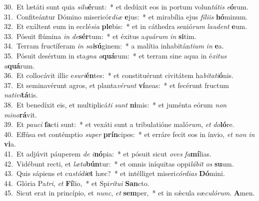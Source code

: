 {30.~}Et lætáti sunt quia \textit{si}\textit{lu}\textbf{é}runt:~* et dedúxit eos in portum volun\textit{tá}\textit{tis} \textit{e}\textbf{ó}rum.\\
{31.~}Confiteántur Dómino misericór\textit{di}\textit{æ} \textbf{e}jus:~* et mirabília ejus \textit{fí}\textit{li}\textit{is} \textbf{hó}minum.\\
{32.~}Et exáltent eum in ecclé\textit{si}\textit{a} \textbf{ple}bis:~* et in cáthedra senió\textit{rum} \textit{lau}\textit{dent} \textbf{e}um.\\
{33.~}Pósuit flúmina \textit{in} \textit{de}\textbf{sér}tum:~* et éxitus a\textit{quá}\textit{rum} \textit{in} \textbf{si}tim.\\
{34.~}Terram fructíferam \textit{in} \textit{sal}\textbf{sú}ginem:~* a malítia inhabitán\textit{ti}\textit{um} \textit{in} \textbf{e}a.\\
{35.~}Pósuit desértum in sta\textit{gna} \textit{a}\textbf{quá}rum:~* et terram sine aqua in é\textit{xi}\textit{tus} \textit{a}\textbf{quá}rum.\\
{36.~}Et collocávit illic e\textit{su}\textit{ri}\textbf{én}tes:~* et constituérunt civitátem ha\textit{bi}\textit{ta}\textit{ti}\textbf{ó}nis.\\
{37.~}Et seminavérunt agros, et planta\textit{vé}\textit{runt} \textbf{ví}neas:~* et fecérunt fructum \textit{na}\textit{ti}\textit{vi}\textbf{tá}tis.\\
{38.~}Et benedíxit eis, et multiplicá\textit{ti} \textit{sunt} \textbf{ni}mis:~* et juménta eórum \textit{non} \textit{mi}\textit{no}\textbf{rá}vit.\\
{39.~}Et \textit{pau}\textit{ci} \textbf{fa}cti sunt:~* et vexáti sunt a tribulatióne maló\textit{rum}, \textit{et} \textit{do}\textbf{ló}re.\\
{40.~}Effúsa est contémptio \textit{su}\textit{per} \textbf{prín}cipes:~* et erráre fecit eos in ínvio, \textit{et} \textit{non} \textit{in} \textbf{vi}a.\\
{41.~}Et adjúvit páuperem \textit{de} \textit{i}\textbf{nó}pia:~* et pósuit sicut \textit{o}\textit{ves} \textit{fa}\textbf{mí}lias.\\
{42.~}Vidébunt recti, et \textit{læ}\textit{ta}\textbf{bún}tur:~* et omnis iníquitas oppi\textit{lá}\textit{bit} \textit{os} \textbf{su}um.\\
{43.~}Quis sápiens et cu\textit{stó}\textit{di}\textbf{et} hæc?~* et intélliget miseri\textit{cór}\textit{di}\textit{as} \textbf{Dó}mini.\\
{44.~}Glória Pa\textit{tri}, \textit{et} \textbf{Fí}lio,~* et Spi\textit{rí}\textit{tu}\textit{i} \textbf{San}cto.\\
{45.~}Sicut erat in princípio, et \textit{nunc}, \textit{et} \textbf{sem}per,~* et in sǽcula sæ\textit{cu}\textit{ló}\textit{rum}. \textbf{A}men.\\
